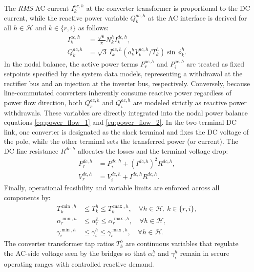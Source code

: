 \documentclass[letterpaper,journal]{IEEEtran}
\begin{document}
The \textit{RMS} AC current $I^{ac,h}_k$ at the converter transformer is proportional to the DC current, while the reactive power
variable $Q^{ac,h}_k$ at the AC interface is derived for all $h \in \mathcal{H}$ and $k \in \{r,i\}$ as follows:
\begin{align}
	I^{ac,h}_k & = \frac{\sqrt{6}}{\pi}N^h_k I^{dc,h}_k, \label{eq:iac_rms}                        \\
	Q^{ac,h}_k & = \sqrt{3}\, I^{ac,h}_k (a^h_k V^{ac,h}_k / T^h_k)\sin\phi^h_k. \label{eq:hvdc_q}
\end{align}
In the nodal balance, the active power terms $P^{ac,h}_{r}$ and $P^{ac,h}_{i}$ are treated as fixed setpoints specified by the system data models,
representing a withdrawal at the rectifier bus and an injection at the inverter bus, respectively. Conversely, because line-commutated converters
inherently consume reactive power regardless of power flow direction, both $Q^{ac,h}_{r}$ and $Q^{ac,h}_{i}$ are modeled strictly as reactive power
withdrawals. These variables are directly integrated into the nodal power balance equations \eqref{eq:power_flow_1} and \eqref{eq:power_flow_2}.
In the two-terminal DC link, one converter is designated as the slack terminal and fixes the DC voltage of the pole, while the other 
terminal sets the transferred power (or current). The DC line resistance $R^{dc,h}$ allocates the losses and the
terminal voltage drop:
\begin{align}
	P^{dc,h}_{r} & = P^{dc,h}_{i} + (I^{dc,h})^2 R^{dc,h}, \label{eq:dc_power_balance} \\
	V^{dc,h}_{r} & = V^{dc,h}_{i} + I^{dc,h} R^{dc,h}.                    \label{eq:dc_voltage_drop}
\end{align}
Finally,
operational feasibility and variable limits are enforced across all components by:
\begin{align}
	T^{\min,h}_k      & \leq T^h_k \leq T^{\max,h}_k, \quad \forall h \in \mathcal{H}, \, k\in\{r,i\}, \\
	\alpha^{\min,h}_r & \leq \alpha^h_r \leq \alpha^{\max,h}_r, \quad \forall h \in \mathcal{H},       \\
	\gamma^{\min,h}_i & \leq \gamma^h_i \leq \gamma^{\max,h}_i, \quad \forall h \in \mathcal{H}.
\end{align}
The converter transformer tap ratios $T^h_k$ are continuous variables that regulate the AC-side voltage seen by the bridges so that
$\alpha^h_r$ and $\gamma^h_i$ remain in secure operating ranges with controlled reactive demand.
\end{document}
